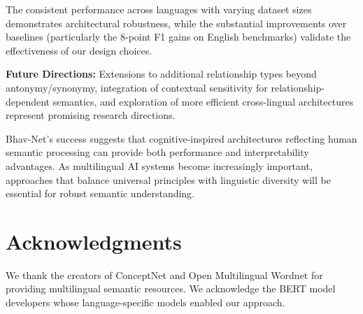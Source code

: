 \documentclass[11pt]{article}
\begin{document}
The consistent performance across languages with varying dataset sizes demonstrates architectural robustness, while the substantial improvements over baselines (particularly the 8-point F1 gains on English benchmarks) validate the effectiveness of our design choices.

\textbf{Future Directions:} Extensions to additional relationship types beyond antonymy/synonymy, integration of contextual sensitivity for relationship-dependent semantics, and exploration of more efficient cross-lingual architectures represent promising research directions.

Bhav-Net's success suggests that cognitive-inspired architectures reflecting human semantic processing can provide both performance and interpretability advantages. As multilingual AI systems become increasingly important, approaches that balance universal principles with linguistic diversity will be essential for robust semantic understanding.

\section*{Acknowledgments}

We thank the creators of ConceptNet and Open Multilingual Wordnet for providing multilingual semantic resources. We acknowledge the BERT model developers whose language-specific models enabled our approach.


\end{document}
